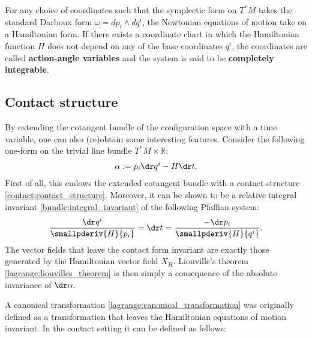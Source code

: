     For any choice of coordinates such that the symplectic form on $T^*M$ takes the standard Darboux form $\omega=dp_i\wedge dq^i$, the Newtonian equations of motion take on a Hamiltonian form. If there exists a coordinate chart in which the Hamiltonian function $H$ does not depend on any of the base coordinates $q^i$, the coordinates are called \textbf{action-angle variables} and the system is said to be \textbf{completely integrable}.

\subsection{Contact structure}

    By extending the cotangent bundle of the configuration space with a time variable, one can also (re)obtain some interesting features. Consider the following one-form on the trivial line bundle $T^*M\times\mathbb{R}$:
    \begin{gather}
        \alpha := p_i\dr q^i - H\dr t.
    \end{gather}
    First of all, this endows the extended cotangent bundle with a contact structure \ref{contact:contact_structure}. Moreover, it can be shown to be a relative integral invariant \ref{bundle:integral_invariant} of the following Pfaffian system:
    \begin{gather}
        \frac{\dr q^i}{\smallpderiv{H}{p_i}} = \dr t = \frac{-\dr p_i}{\smallpderiv{H}{q^i}}.
    \end{gather}
    The vector fields that leave the contact form invariant are exactly those generated by the Hamiltonian vector field $X_H$. Liouville's theorem \ref{lagrange:liouvilles_theorem} is then simply a consequence of the absolute invariance of $\dr\alpha$.

    A canonical transformation \ref{lagrange:canonical_transformation} was originally defined as a transformation that leaves the Hamiltonian equations of motion invariant. In the contact setting it can be defined as follows:

